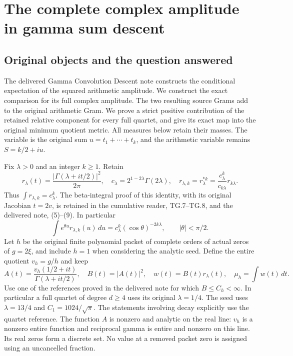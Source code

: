 \begingroup
\def\C{\mathbb C}
\def\R{\mathbb R}
\def\HH{\mathcal H}
\def\PP{\mathcal P}
\def\V{\mathcal V}
\def\diag{\operatorname{diag}}
\section{The complete complex amplitude in gamma sum descent}



\subsection{Original objects and the question answered}
The delivered Gamma Convolution Descent note constructs the conditional
expectation of the squared arithmetic amplitude. We construct the exact
comparison for its full complex amplitude. The two resulting source
Grams add to the original arithmetic Gram. We prove a strict positive
contribution of the retained relative component for every full quartet,
and give its exact map into the original minimum quotient metric.
All measures below retain their masses. The variable is the original
sum $u=t_1+\cdots+t_k$, and the arithmetic variable remains $S=k/2+iu$.

Fix $\lambda>0$ and an integer $k\geq1$. Retain
\begin{equation}
 r_\lambda(t)=\frac{|\Gamma(\lambda+it/2)|^2}{2\pi},\quad
 c_\lambda=2^{1-2\lambda}\Gamma(2\lambda),\quad
 r_{\lambda,k}=r_\lambda^{*k}=
 \frac{c_\lambda^k}{c_{k\lambda}}r_{k\lambda}.
 \tag{GP.1}
\end{equation}
Thus $\int r_{\lambda,k}=c_\lambda^k$. The beta-integral proof of
this identity, with its original Jacobian $t=2v$, is retained in
the cumulative reader, TG.7--TG.8, and the delivered note, (5)--(9).
In particular
\begin{equation}
 \int e^{\theta u}r_{\lambda,k}(u)\,du
       =c_\lambda^k(\cos\theta)^{-2k\lambda},
       \qquad |\theta|<\pi/2.
 \tag{GP.2}
\end{equation}
Let $h$ be the original finite polynomial packet of complete orders of
actual zeros of $g=2\xi$, and include $h=1$ when considering the analytic
seed. Define the entire quotient $v_h=g/h$ and keep
\begin{equation}
 A(t)=\frac{v_h(1/2+it)}{\Gamma(\lambda+it/2)},\quad
 B(t)=|A(t)|^2,\quad w(t)=B(t)r_\lambda(t),\quad
 \mu_h=\int w(t)\,dt.
 \tag{GP.3}
\end{equation}
Use one of the references proved in the delivered note for which
$B\leq C_h<\infty$. In particular a full quartet of degree $d\geq4$
uses its original $\lambda=1/4$. The seed uses $\lambda=13/4$ and
$C_1=1024/\sqrt\pi$. The statements involving decay explicitly use
the quartet reference. The function $A$ is nonzero and analytic on
the real line: $v_h$ is a nonzero entire function and reciprocal gamma
is entire and nonzero on this line. Its real zeros form a discrete
set. No value at a removed packet zero is assigned using an uncancelled
fraction.

